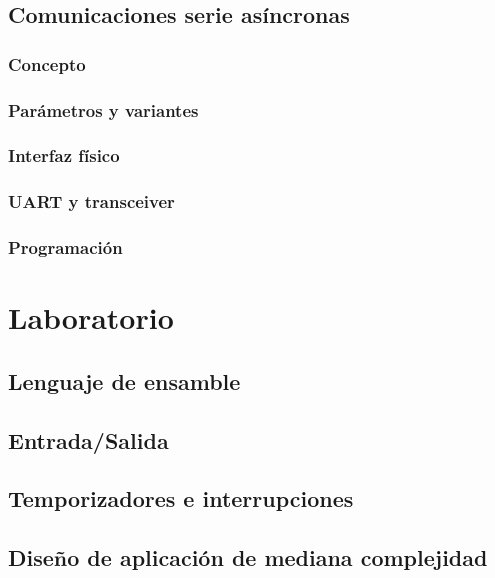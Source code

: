 \documentclass[a4paper]{book}
\numberwithin{figure}{chapter}
\numberwithin{equation}{chapter}
\begin{document}
\section{Comunicaciones serie asíncronas}
\subsection{Concepto}
\subsection{Parámetros y variantes}
\subsection{Interfaz físico}
\subsection{UART y transceiver}
\subsection{Programación}

\chapter{Laboratorio}
\section{Lenguaje de ensamble}
\section{Entrada/Salida}
\section{Temporizadores e interrupciones}
\section{Diseño de aplicación de mediana complejidad}

% 
\end{document}
